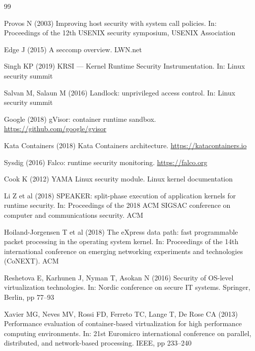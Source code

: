 \documentclass[]{sn-jnl}
\begin{document}

\begin{thebibliography}{99}

Provos N (2003) Improving host security with system call policies.
In: Proceedings of the 12th USENIX security symposium, USENIX Association

Edge J (2015) A seccomp overview. LWN.net

Singh KP (2019) KRSI --- Kernel Runtime Security Instrumentation.
In: Linux security summit

Salvan M, Salaun M (2016) Landlock: unprivileged access control.
In: Linux security summit

Google (2018) gVisor: container runtime sandbox.
\url{https://github.com/google/gvisor}

Kata Containers (2018) Kata Containers architecture.
\url{https://katacontainers.io}

Sysdig (2016) Falco: runtime security monitoring.
\url{https://falco.org}

Cook K (2012) YAMA Linux security module. Linux kernel documentation

Li Z et al (2018) SPEAKER: split-phase execution of application kernels for
runtime security. In: Proceedings of the 2018 ACM SIGSAC conference on computer
and communications security. ACM

Hoiland-Jorgensen T et al (2018) The eXpress data path: fast programmable packet
processing in the operating system kernel. In: Proceedings of the 14th
international conference on emerging networking experiments and technologies
(CoNEXT). ACM

Reshetova E, Karhunen J, Nyman T, Asokan N (2016) Security of OS-level
virtualization technologies. In: Nordic conference on secure IT systems. Springer,
Berlin, pp 77--93

Xavier MG, Neves MV, Rossi FD, Ferreto TC, Lange T, De Rose CA (2013)
Performance evaluation of container-based virtualization for high performance
computing environments. In: 21st Euromicro international conference on parallel,
distributed, and network-based processing. IEEE, pp 233--240


\end{thebibliography}
\end{document}
